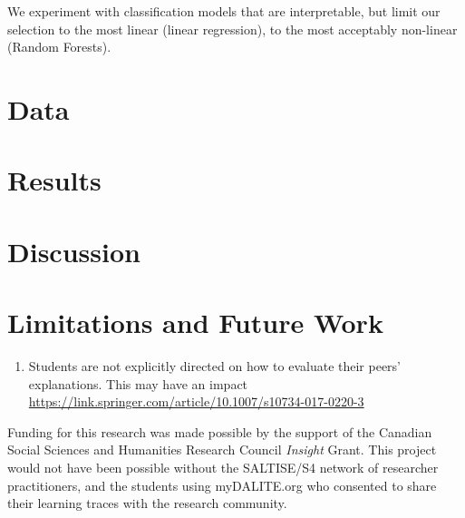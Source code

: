 \documentclass[sigconf]{acmart}
\begin{document}
We experiment with classification models that are interpretable, but limit our 
selection to the most linear (linear regression), to the most acceptably 
non-linear (Random Forests).


\section{Data}

\section{Results}

\section{Discussion}

\section{Limitations and Future Work}
\begin{enumerate}
	\item Students are not explicitly directed on how to evaluate their peers' 
	explanations. This may have an impact 
	 \url{https://link.springer.com/article/10.1007/s10734-017-0220-3}
\end{enumerate}

\begin{acks}
Funding for this research was made possible by the support of the Canadian 
Social Sciences and Humanities Research Council \textit{Insight} Grant. This 
project would not have been possible without the SALTISE/S4 network of 
researcher practitioners, and the students using myDALITE.org who consented to 
share their learning traces with the research community.
\end{acks}



\end{document}
